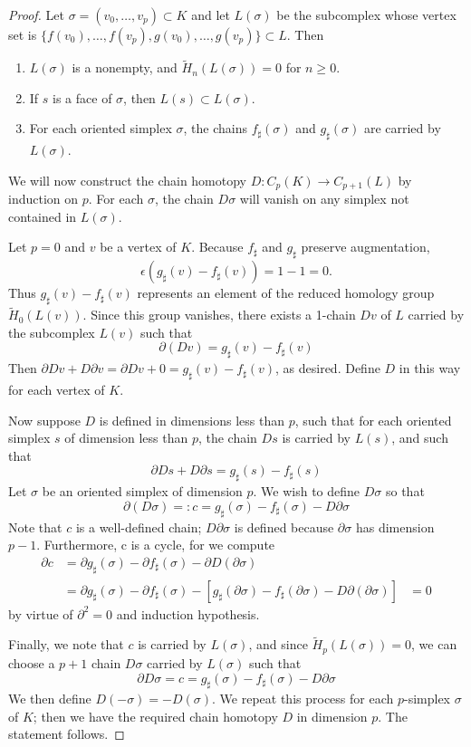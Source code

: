 \documentclass[toc=bib, headinclude]{scrartcl}
\theoremstyle{plain}
\theoremstyle{definition}
\theoremstyle{remark}
\begin{document}
\begin{proof}
	Let $\sigma=(v_0,\dots, v_p)\subset K$ and let  $L(\sigma)$ be the subcomplex whose vertex set is $\{f(v_0),\dots,f(v_p),g(v_0),\dots,g(v_p)\}\subset L$. Then
	\begin{enumerate}
		\item $L(\sigma)$ is a nonempty, and $\tilde{H}_n(L(\sigma))=0 $ for $n\geq 0$. 
		\item If $s$ is a face of $\sigma$, then $L(s)\subset L(\sigma)$.
		\item For each oriented simplex $\sigma$, the chains $f_\sharp(\sigma)$ and $g_\sharp(\sigma)$ are carried by $L(\sigma)$.
	\end{enumerate}
	
	We will now construct the chain homotopy $D: C_p(K)\to C_{p+1}(L)$ by induction on $p$. For each $\sigma$, the chain $D\sigma$ will vanish on any simplex not contained in $L(\sigma)$.
	
	Let $p=0$ and $v$ be a vertex of $K$. Because $f_\sharp$ and $g_\sharp$ preserve augmentation, \[
	\epsilon(g_\sharp(v)-f_\sharp(v))=1-1=0.
	\]
	Thus $g_\sharp(v)-f_\sharp(v)$ represents an element of the reduced homology group $\tilde{H}_0(L(v))$. %
	Since this group vanishes, there exists a 1-chain $Dv$ of $L$ carried by the subcomplex $L(v)$ such that
	\[
	\partial(Dv)=g_\sharp(v)-f_\sharp(v)
	\]
	Then $\partial Dv+D\partial v=\partial Dv+0=g_\sharp(v)-f_\sharp(v)$, as desired. Define $D$ in this way for each vertex of $K$.
	
	Now suppose $D$ is defined in dimensions less than $p$, such that for each oriented simplex $s$ of dimension less than $p$, the chain $Ds$ is carried by $L(s)$, and such that 
	\[
	\partial Ds+D\partial s=g_\sharp(s)-f_\sharp(s)
	\]
	Let $\sigma$ be an oriented simplex of dimension $p$. We wish to define $D\sigma$ so that 
	\[
	\partial (D\sigma)=:c=g_\sharp(\sigma)-f_\sharp(\sigma)-D\partial\sigma
	\]
	Note that $c$ is a well-defined chain; $D\partial\sigma$ is defined because $\partial \sigma$ has dimension $p-1$. Furthermore, c is a cycle, for we compute
	\begin{align*}
	\partial c&=\partial g_\sharp(\sigma)-\partial f_\sharp(\sigma)-\partial D(\partial \sigma)\\
	&=\partial g_\sharp(\sigma)-\partial f_\sharp(\sigma)-[g_\sharp(\partial\sigma)-f_\sharp(\partial\sigma)-D\partial(\partial\sigma)]
	&=0
	\end{align*}
	by virtue of $\partial^2=0$ and induction hypothesis.
	
	Finally, we note that $c$ is carried by $L(\sigma)$, and since $\tilde{H}_p(L(\sigma))=0$, we can choose a $p+1$ chain $D\sigma$ carried by $L(\sigma)$ such that 
	\[
	\partial D\sigma=c=g_\sharp(\sigma)-f_\sharp(\sigma)-D\partial\sigma
	\]
	We then define $D(-\sigma)=-D(\sigma)$. We repeat this process for each $p$-simplex $\sigma$ of $K$; then we have the required chain homotopy $D$ in dimension $p$. The statement follows.
\end{proof}	
	
\end{document}

